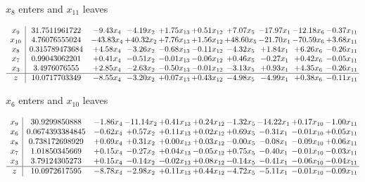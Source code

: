 \documentclass[9pt]{article}
\begin{document}
 $ x_{8} $ enters and $ x_{11} $ leaves 

 \[\begin{array}{c| c c@{\hskip 2pt} c@{\hskip 2pt} c@{\hskip 2pt} c@{\hskip 2pt} c@{\hskip 2pt} c@{\hskip 2pt} c@{\hskip 2pt} c@{\hskip 2pt} }
 x_{9}   &  31.7511961722 & -9.43 x_{4} & -4.19 x_{2} & +  1.75 x_{13} & +  0.51 x_{12} & +  7.07 x_{5} & -17.97 x_{1} & -12.18 x_{6} & -0.37 x_{11}\\
 x_{10}   &  4.76076555024 & -43.83 x_{4} & + 40.32 x_{2} & +  7.76 x_{13} & +  1.56 x_{12} & + 48.60 x_{5} & -21.70 x_{1} & -70.59 x_{6} & +  3.68 x_{11}\\
 x_{8}   &  0.315789473684 & +  4.58 x_{4} & -3.26 x_{2} & -0.68 x_{13} & -0.11 x_{12} & -4.32 x_{5} & +  1.84 x_{1} & +  6.26 x_{6} & -0.26 x_{11}\\
 x_{7}   &  0.99043062201 & +  0.41 x_{4} & -0.51 x_{2} & -0.01 x_{13} & -0.06 x_{12} & +  0.46 x_{5} & -0.27 x_{1} & +  0.42 x_{6} & -0.05 x_{11}\\
 x_{3}   &  3.4976076555 & +  2.85 x_{4} & -2.63 x_{2} & -0.50 x_{13} & -0.01 x_{12} & -3.13 x_{5} & +  0.93 x_{1} & +  4.35 x_{6} & -0.26 x_{11}\\
\hline
z    &  10.0717703349 & -8.55 x_{4} & -3.20 x_{2} & +  0.07 x_{13} & +  0.43 x_{12} & -4.98 x_{5} & -4.99 x_{1} & +  0.38 x_{6} & -0.11 x_{11}\\
\end{array}\]


 $ x_{6} $ enters and $ x_{10} $ leaves 

 \[\begin{array}{c| c c@{\hskip 2pt} c@{\hskip 2pt} c@{\hskip 2pt} c@{\hskip 2pt} c@{\hskip 2pt} c@{\hskip 2pt} c@{\hskip 2pt} c@{\hskip 2pt} }
 x_{9}   &  30.9299850888 & -1.86 x_{4} & -11.14 x_{2} & +  0.41 x_{13} & +  0.24 x_{12} & -1.32 x_{5} & -14.22 x_{1} & +  0.17 x_{10} & -1.00 x_{11}\\
 x_{6}   &  0.0674393384845 & -0.62 x_{4} & +  0.57 x_{2} & +  0.11 x_{13} & +  0.02 x_{12} & +  0.69 x_{5} & -0.31 x_{1} & -0.01 x_{10} & +  0.05 x_{11}\\
 x_{8}   &  0.738172698929 & +  0.69 x_{4} & +  0.31 x_{2} & +  0.00 x_{13} & +  0.03 x_{12} & -0.00 x_{5} & -0.08 x_{1} & -0.09 x_{10} & +  0.06 x_{11}\\
 x_{7}   &  1.01850345669 & +  0.15 x_{4} & -0.27 x_{2} & +  0.04 x_{13} & -0.05 x_{12} & +  0.75 x_{5} & -0.40 x_{1} & -0.01 x_{10} & -0.03 x_{11}\\
 x_{3}   &  3.79124305273 & +  0.15 x_{4} & -0.14 x_{2} & -0.02 x_{13} & +  0.08 x_{12} & -0.14 x_{5} & -0.41 x_{1} & -0.06 x_{10} & -0.04 x_{11}\\
\hline
z    &  10.0972617595 & -8.78 x_{4} & -2.98 x_{2} & +  0.11 x_{13} & +  0.44 x_{12} & -4.72 x_{5} & -5.11 x_{1} & -0.01 x_{10} & -0.09 x_{11}\\
\end{array}\]
\end{document}
